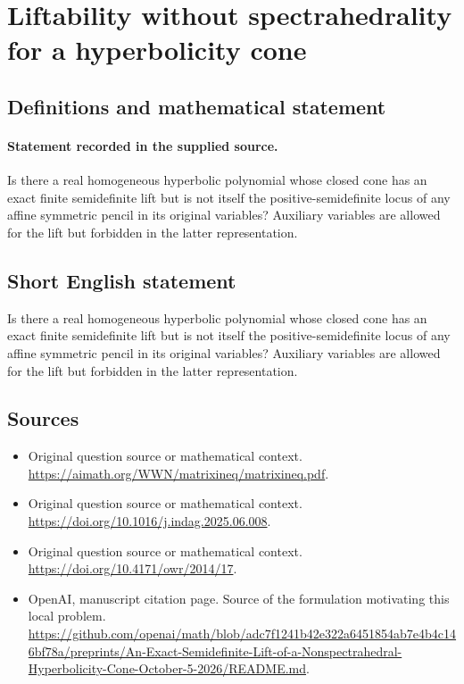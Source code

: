 \documentclass[11pt]{article}
\begin{document}
\section*{Liftability without spectrahedrality for a hyperbolicity cone}\label{statement}
\subsection{Definitions and mathematical statement}
\paragraph{Statement recorded in the supplied source.}
Is there a real homogeneous hyperbolic polynomial whose closed cone has an exact finite semidefinite lift but is not itself the positive-semidefinite locus of any affine symmetric pencil in its original variables? Auxiliary variables are allowed for the lift but forbidden in the latter representation.
\subsection{Short English statement}
Is there a real homogeneous hyperbolic polynomial whose closed cone has an exact finite semidefinite lift but is not itself the positive-semidefinite locus of any affine symmetric pencil in its original variables? Auxiliary variables are allowed for the lift but forbidden in the latter representation.
\subsection{Sources}
\begin{itemize}
\item[S1] Original question source or mathematical context.
\url{https://aimath.org/WWN/matrixineq/matrixineq.pdf}.
\item[S2] Original question source or mathematical context.
\url{https://doi.org/10.1016/j.indag.2025.06.008}.
\item[S3] Original question source or mathematical context.
\url{https://doi.org/10.4171/owr/2014/17}.
\item[S4] OpenAI, manuscript citation page. Source of the formulation motivating this local problem.
\url{https://github.com/openai/math/blob/adc7f1241b42e322a6451854ab7e4b4c146bf78a/preprints/An-Exact-Semidefinite-Lift-of-a-Nonspectrahedral-Hyperbolicity-Cone-October-5-2026/README.md}.
\end{itemize}
\end{document}
